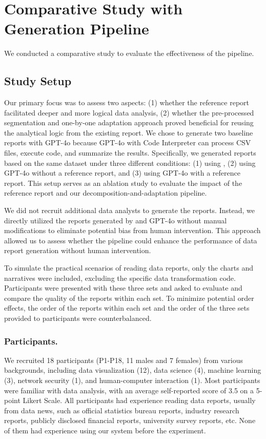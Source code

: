 \section{Comparative Study with \system{} Generation Pipeline}
\label{sec:comparative_study}

We conducted a comparative study to evaluate the effectiveness of the \system{} pipeline. 

\subsection{Study Setup}
Our primary focus was to assess two aspects:
(1) whether the reference report facilitated deeper and more logical data analysis, 
(2) whether the pre-processed segmentation and one-by-one adaptation approach proved beneficial for reusing the analytical logic from the existing report.
We chose to generate two baseline reports with GPT-4o because GPT-4o with Code Interpreter can process CSV files, execute code, and summarize the results. 
Specifically, we generated reports based on the same dataset under three different conditions: (1) using \system{}, (2) using GPT-4o without a reference report, and (3) using GPT-4o with a reference report. This setup serves as an ablation study to evaluate the impact of the reference report and our decomposition-and-adaptation pipeline.

We did not recruit additional data analysts to generate the reports. 
Instead, we directly utilized the reports generated by \system{} and GPT-4o without manual modifications to eliminate potential bias from human intervention. 
This approach allowed us to assess whether the \system{} pipeline could enhance the performance of data report generation without human intervention.

To simulate the practical scenarios of reading data reports, only the charts and narratives were included, excluding the specific data transformation code.
Participants were presented with these three sets and asked to evaluate and compare the quality of the reports within each set. 
To minimize potential order effects, the order of the reports within each set and the order of the three sets provided to participants were counterbalanced.

\subsubsection{Participants. }
We recruited 18 participants (P1-P18, 11 males and 7 females) from various backgrounds, including data visualization (12), data science (4), machine learning (3), network security (1), and human-computer interaction (1). 
Most participants were familiar with data analysis, with an average self-reported score of 3.5 on a 5-point Likert Scale. 
All participants had experience reading data reports, usually from data news, such as official statistics bureau reports, industry research reports, publicly disclosed financial reports, university survey reports, etc.
None of them had experience using our system before the experiment. 

